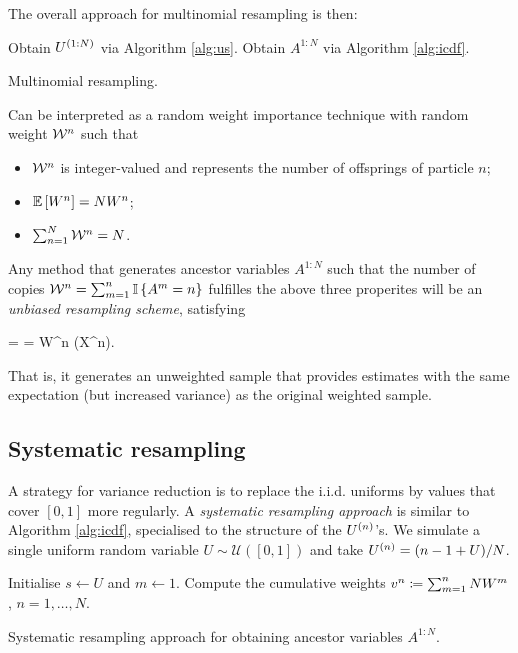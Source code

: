 The overall approach for multinomial resampling is then:

\begin{algorithm}[ht]
  \DontPrintSemicolon
  Obtain $U^{(1:N)}$ via Algorithm \ref{alg:us}. \;
  Obtain $A^{1:N}$ via Algorithm \ref{alg:icdf}. \;
  \caption{Multinomial resampling.}
  \label{alg:mr}
\end{algorithm}

Can be interpreted as a random weight importance technique with random weight $\mathcal{W}^n$ such that

\begin{itemize}
  \item $\mathcal{W}^n$ is integer-valued and represents the number of offsprings of particle $n$;
  \item $\mathbb{E}\left[W^n\right] = NW^n$;
  \item $\sum_{n=1}^{N}\mathcal{W}^n = N$.
\end{itemize}

Any method that generates ancestor variables $A^{1:N}$ such that the number of copies $\mathcal{W}^n = \sum_{m=1}^{n} \mathbb{I}\left\{A^m = n\right\}$ fulfilles the above three properites will be an \textit{unbiased resampling scheme}, satisfying

\beq
   =  =  W^n \varphi(X^n).
\eeq

That is, it generates an unweighted sample that provides estimates with the same expectation (but increased variance) as the original weighted sample.

\subsection{Systematic resampling}

A strategy for variance reduction is to replace the i.i.d. uniforms by values that cover $[0,1]$ more regularly. A \textit{systematic resampling approach} is similar to Algorithm \ref{alg:icdf}, specialised to the structure of the $U^{(n)}$'s. We simulate a single uniform random variable $U \sim \mathcal{U}\left([0,1]\right)$ and take $U^{(n)} = (n-1+U)/N$.

\begin{algorithm}[ht]
  \DontPrintSemicolon
  Initialise $s \leftarrow U$ and $m \leftarrow 1$. \;
  Compute the cumulative weights $v^n \coloneqq \sum_{m=1}^{n} NW^m$, $n = 1, \dots, N$. \;
  \caption{Systematic resampling approach for obtaining ancestor variables $A^{1:N}$.}
  \label{alg:sr}
\end{algorithm}

